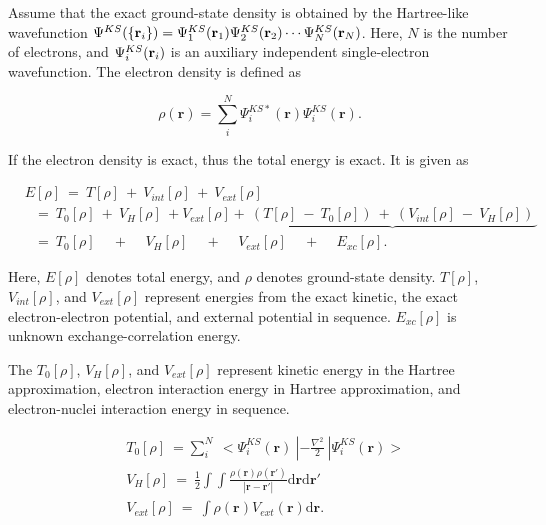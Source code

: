 \documentclass[a4paper, 12pt, titlepage,oneside,drop]{kthesis}
\begin{document}
Assume that the exact ground-state density is obtained by the Hartree-like wavefunction $\wfks = \bwf<1><1> \bwf<2><2> \cdots \bwf<N><N>$. Here, $N$ is the number of electrons, and $\bwf<i><i>$ is an auxiliary independent
single-electron wavefunction. The electron density is defined as

\begin{equation}\label{ks1}
 \rho(\textbf{r}) = \sum\limits_i^{N} {\Psi^{{KS}*}_{i}(\textbf{r})} {\Psi^{{KS}}_{i}(\textbf{r})}.
\end{equation}

If the electron density is exact, thus the total energy is exact. It is given as

\begin{equation}\label{kse}
\begin{split}
&E[\rho] \ =\ T[\rho] \ + \ V_{int}[\rho] \ + \ V_{ext}[\rho]  \\
&\ \ \   = \ T_{0}[\rho] \ + \ V_{H}[\rho] \ + V_{ext}[\rho]+\underbrace{\ (T[\rho] \ - \ T_{0}[\rho]) \ + \  (V_{int}[\rho] \ - \ V_{H}[\rho])\ }       \\
&\ \ \   = \ T_{0}[\rho] \quad \,  + \quad \,  V_{H}[\rho] \quad \, + \quad \, V_{ext}[\rho] \quad \, + \quad \, E_{xc}[\rho].
\end{split}
\end{equation}

Here, $E[\rho]$ denotes total energy, and $\rho$ denotes ground-state density. $T[\rho]$, $V_{int}[\rho]$, and $V_{ext}[\rho]$ represent energies from the exact kinetic, 
the exact electron-electron potential, and external potential in sequence. $E_{xc}[\rho]$ is unknown exchange-correlation energy.

The $T_{0}[\rho]$, $V_{H}[\rho]$, and $V_{ext}[\rho]$ represent kinetic energy in the Hartree approximation, electron interaction energy in Hartree approximation, and electron-nuclei interaction energy in sequence.

\begin{equation}\begin{split}\label{kankan}
& T_{0}[\rho]\ = \sum\limits_i^{N} \ < \Psi_{i}^{{KS}}(\textbf{r}) \ | -\frac{\nabla^{2}}{2} \ | \Psi_{i}^{{KS}}(\textbf{r}) > \\
& V_{H}[\rho] \ = \ \frac{1}{2} \int \int  \frac{\rho({\textbf{r}})\rho(\textbf{r}')}{|{\textbf{r}}-{\textbf{r}}'|} \mathrm{d} {\textbf{r}} \mathrm{d}{\textbf{r}'}\\
& V_{ext}[\rho]\ = \ \int  \rho(\textbf{r}) V_{ext}(\textbf{r})\mathrm{d}{\textbf{r}}. 
\end{split}
\end{equation}
\end{document}
